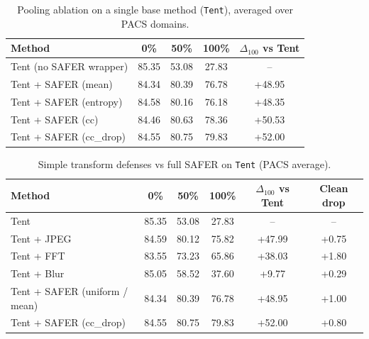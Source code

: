 \begin{table}[t]
\centering
\caption{Pooling ablation on a single base method (\texttt{Tent}), averaged over PACS domains.}
\label{tab:abl-pooling-tent}
\begin{tabular}{lcccc}
\hline
Method & 0\% & 50\% & 100\% & $\Delta_{100}$ vs Tent \\
\hline
Tent (no SAFER wrapper) & 85.35 & 53.08 & 27.83 & -- \\
Tent + SAFER (mean) & 84.34 & 80.39 & 76.78 & +48.95 \\
Tent + SAFER (entropy) & 84.58 & 80.16 & 76.18 & +48.35 \\
Tent + SAFER (cc) & 84.46 & 80.63 & 78.36 & +50.53 \\
Tent + SAFER (cc_drop) & 84.55 & 80.75 & 79.83 & +52.00 \\
\hline
\end{tabular}
\end{table}

\begin{table}[t]
\centering
\caption{Simple transform defenses vs full SAFER on \texttt{Tent} (PACS average).}
\label{tab:abl-simple-vs-safer}
\begin{tabular}{lccccc}
\hline
Method & 0\% & 50\% & 100\% & $\Delta_{100}$ vs Tent & Clean drop \\
\hline
Tent & 85.35 & 53.08 & 27.83 & -- & -- \\
Tent + JPEG & 84.59 & 80.12 & 75.82 & +47.99 & +0.75 \\
Tent + FFT & 83.55 & 73.23 & 65.86 & +38.03 & +1.80 \\
Tent + Blur & 85.05 & 58.52 & 37.60 & +9.77 & +0.29 \\
Tent + SAFER (uniform / mean) & 84.34 & 80.39 & 76.78 & +48.95 & +1.00 \\
Tent + SAFER (cc_drop) & 84.55 & 80.75 & 79.83 & +52.00 & +0.80 \\
\hline
\end{tabular}
\end{table}
